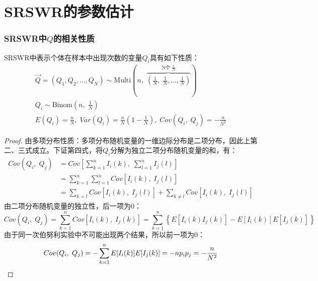 \section{SRSWR的参数估计}
\subsubsection{SRSWR中$Q$的相关性质}
\begin{theorem}
	SRSWR中表示个体在样本中出现次数的变量$Q_i$具有如下性质：
	\begin{gather*}
		\overrightarrow{Q}=(Q_1,Q_2,\dots,Q_N)\sim \text{Multi}\left(n,\; \overbrace{\left(\frac{1}{N},\;\frac{1}{N},\dots,\frac{1}{N}\right)}^{\text{N个}\;\frac{1}{N}}\right)\\
		Q_i\sim\text{Binom}\left(n,\;\frac{1}{N}\right) \\
		E(Q_i)=\frac{n}{N},\;Var(Q_i)=\frac{n}{N}\left(1-\frac{1}{N}\right) ,\;Cov(Q_i,\;Q_j)=-\frac{n}{N^2}
	\end{gather*}
\end{theorem}
\begin{proof} 
	由多项分布性质：多项分布随机变量的一维边际分布是二项分布，因此上第二、三式成立。下证第四式，将$Q_i$分解为独立二项分布随机变量的和，有：
	\begin{align*}
		Cov(Q_i,\;Q_j)&=Cov\left[\sum_{k=1}^nI_i(k),\;\sum_{l=1}^nI_j(l)\right] \\
		&=\sum_{k=1}^n\sum_{l=1}^nCov[I_i(k),\;I_j(l)] \\
		&=\sum_{k=l}Cov[I_i(k),\;I_j(l)]+\sum_{k\ne l}Cov[I_i(k),\;I_j(l)]
	\end{align*}
	由二项分布随机变量的独立性，后一项为$0$：
	\begin{equation*}
		Cov(Q_i,\;Q_j)
		=\sum_{k=1}^nCov[I_i(k),\;I_j(k)] =\sum_{k=1}^n\left\{E[I_i(k)I_j(k)]-E[I_i(k)]E[I_j(k)]\right\}
	\end{equation*}
	由于同一次伯努利实验中不可能出现两个结果，所以前一项为$0$：
	\begin{equation*}
		Cov(Q_i,\;Q_j)
		=-\sum_{k=1}^nE[I_i(k)]E[I_j(k)]
		=-np_ip_j
		=-\frac{n}{N^2} \qedhere
	\end{equation*}
\end{proof}

